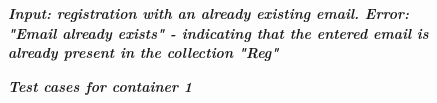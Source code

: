 \begin{figure}[htp]
    \centering
    \caption{\textbf{\textit{Input: registration with an already existing email. Error: "Email already exists" - indicating that the entered email is already present in the collection "Reg"}}}
    \label{fig:test-case-email-exists}
\end{figure}

\begin{figure}[htp]
    \centering
    \caption{\textbf{\textit{Test cases for container 1}}}
    \label{fig:test-case-container-1}
\end{figure}

